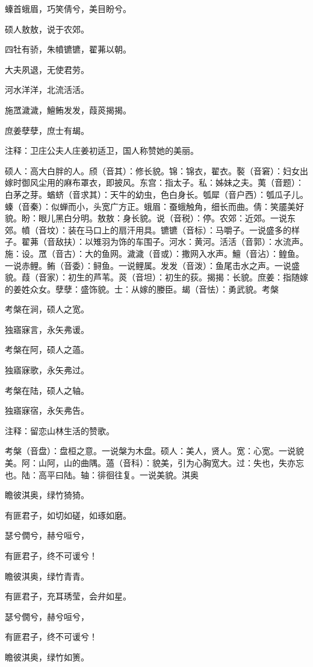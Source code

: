 \documentclass[12pt,UTF8]{ctexbook}
\begin{document}
螓首蛾眉，巧笑倩兮，美目盼兮。

硕人敖敖，说于农郊。

四牡有骄，朱幩镳镳，翟茀以朝。

大夫夙退，无使君劳。

河水洋洋，北流活活。

施罛濊濊，鱣鲔发发，葭菼揭揭。

庶姜孽孽，庶士有朅。

注释：卫庄公夫人庄姜初适卫，国人称赞她的美丽。

硕人：高大白胖的人。颀（音其）：修长貌。锦：锦衣，翟衣。褧（音窘）：妇女出嫁时御风尘用的麻布罩衣，即披风。东宫：指太子。私：姊妹之夫。荑（音题）：白茅之芽。蝤蛴（音求其）：天牛的幼虫，色白身长。瓠犀（音户西）：瓠瓜子儿。螓（音秦）：似蝉而小，头宽广方正。蛾眉：蚕蛾触角，细长而曲。倩：笑靥美好貌。盼：眼儿黑白分明。敖敖：身长貌。说（音税）：停。农郊：近郊。一说东郊。幩（音坟）：装在马口上的扇汗用具。镳镳（音标）：马嚼子。一说盛多的样子。翟茀（音敌扶）：以雉羽为饰的车围子。河水：黄河。活活（音郭）：水流声。施：设。罛（音古）：大的鱼网。濊濊（音或）：撒网入水声。鱣（音沾）：鳇鱼。一说赤鲤。鲔（音委）：鲟鱼。一说鲤属。发发（音泼）：鱼尾击水之声。一说盛貌。葭（音家）：初生的芦苇。菼（音坦）：初生的荻。揭揭：长貌。庶姜：指随嫁的姜姓众女。孽孽：盛饰貌。士：从嫁的媵臣。朅（音怯）：勇武貌。考槃

考槃在涧，硕人之宽。

独寤寐言，永矢弗谖。

考槃在阿，硕人之薖。

独寤寐歌，永矢弗过。

考槃在陆，硕人之轴。

独寤寐宿，永矢弗告。

注释：留恋山林生活的赞歌。

考槃（音盘）：盘桓之意。一说槃为木盘。硕人：美人，贤人。宽：心宽。一说貌美。阿：山阿，山的曲隅。薖（音科）：貌美，引为心胸宽大。过：失也，失亦忘也。陆：高平曰陆。轴：徘徊往复。一说美貌。淇奥

瞻彼淇奥，绿竹猗猗。

有匪君子，如切如磋，如琢如磨。

瑟兮僩兮，赫兮咺兮，

有匪君子，终不可谖兮！

瞻彼淇奥，绿竹青青。

有匪君子，充耳琇莹，会弁如星。

瑟兮僩兮，赫兮咺兮，

有匪君子，终不可谖兮！

瞻彼淇奥，绿竹如箦。
\end{document}
